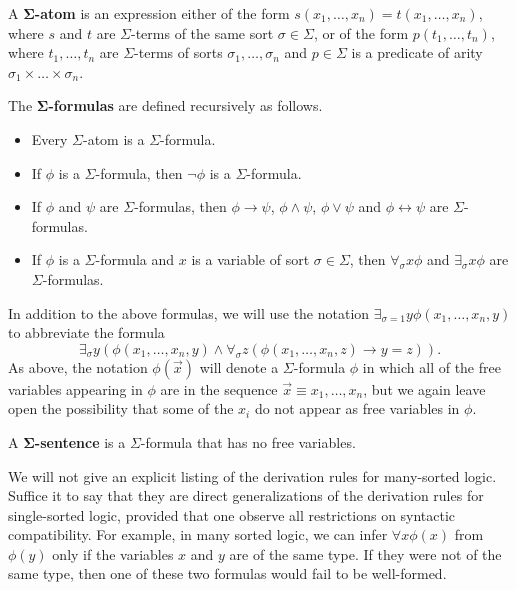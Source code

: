 A \textbf{$\mathbf{\Sigma}$-atom} is an expression either of the form
$s(x_1,\ldots, x_n)=t(x_1,\ldots, x_n)$, where $s$ and $t$ are
$\Sigma$-terms of the same sort $\sigma\in\Sigma$, or of the form
$p(t_1,\ldots, t_n)$, where $t_1,\ldots, t_n$ are $\Sigma$-terms of
sorts $\sigma_1, \ldots, \sigma_n$ and $p\in\Sigma$ is a predicate of
arity $\sigma_1\times\ldots\times\sigma_n$.

\begin{defn} The \textbf{$\mathbf{\Sigma}$-formulas} are defined
  recursively as follows.
\begin{itemize}
\item Every $\Sigma$-atom is a $\Sigma$-formula.
\item If $\phi$ is a $\Sigma$-formula, then $\lnot\phi$ is a $\Sigma$-formula.
\item If $\phi$ and $\psi$ are $\Sigma$-formulas, then
  $\phi\rightarrow\psi$, $\phi\land\psi$, $\phi\lor\psi$ and
  $\phi\leftrightarrow\psi$ are $\Sigma$-formulas.
\item If $\phi$ is a $\Sigma$-formula and $x$ is a variable of sort
  $\sigma\in\Sigma$, then $\forall_\sigma x\phi$ and
  $\exists_\sigma x\phi$ are $\Sigma$-formulas.
\end{itemize} \end{defn}

In addition to the above formulas, we will use the notation
$\exists_{\sigma=1}y \phi(x_1,\ldots, x_n, y)$ to abbreviate the
formula
\[ \exists_\sigma y(\phi(x_1,\ldots, x_n, y)\land\forall_\sigma
  z(\phi(x_1,\ldots, x_n,z)\rightarrow y=z)) .\] As above, the
notation $\phi(\vec{x})$ will denote a $\Sigma$-formula $\phi$ in
which all of the free variables appearing in $\phi$ are in the
sequence $\vec{x}\equiv x_1,\ldots, x_n$, but we again leave open the
possibility that some of the $x_i$ do not appear as free variables in
$\phi$.

\begin{defn} A $\mathbf{\Sigma}$\textbf{-sentence} is a
  $\Sigma$-formula that has no free variables. \end{defn}

We will not give an explicit listing of the derivation rules for
many-sorted logic.  Suffice it to say that they are direct
generalizations of the derivation rules for single-sorted logic,
provided that one observe all restrictions on syntactic compatibility.
For example, in many sorted logic, we can infer $\forall x\phi (x)$
from $\phi (y)$ only if the variables $x$ and $y$ are of the same
type.  If they were not of the same type, then one of these two
formulas would fail to be well-formed.


